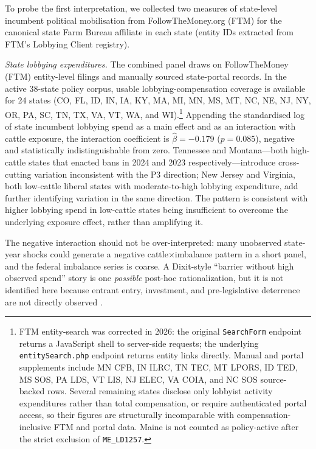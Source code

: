 \documentclass[12pt]{article}
\begin{document}
To probe the first interpretation, we collected two measures of state-level incumbent political mobilisation from FollowTheMoney.org (FTM) for the canonical state Farm Bureau affiliate in each state (entity IDs extracted from FTM's Lobbying Client registry).

\textit{State lobbying expenditures.}  The combined panel draws on FollowTheMoney (FTM) entity-level filings and manually sourced state-portal records.  In the active 38-state policy corpus, usable lobbying-compensation coverage is available for 24 states (CO, FL, ID, IN, IA, KY, MA, MI, MN, MS, MT, NC, NE, NJ, NY, OR, PA, SC, TN, TX, VA, VT, WA, and WI).\footnote{FTM entity-search was corrected in 2026: the original \texttt{SearchForm} endpoint returns a JavaScript shell to server-side requests; the underlying \texttt{entitySearch.php} endpoint returns entity links directly.  Manual and portal supplements include MN CFB, IN ILRC, TN TEC, MT LPORS, ID TED, MS SOS, PA LDS, VT LIS, NJ ELEC, VA COIA, and NC SOS source-backed rows.  Several remaining states disclose only lobbyist activity expenditures rather than total compensation, or require authenticated portal access, so their figures are structurally incomparable with compensation-inclusive FTM and portal data.  Maine is not counted as policy-active after the strict exclusion of \texttt{ME\_LD1257}.}  Appending the standardised log of state incumbent lobbying spend as a main effect and as an interaction with cattle exposure, the interaction coefficient is $\hat{\beta} = -0.179$ ($p = 0.085$), negative and statistically indistinguishable from zero.  Tennessee and Montana---both high-cattle states that enacted bans in 2024 and 2023 respectively---introduce cross-cutting variation inconsistent with the P3 direction; New Jersey and Virginia, both low-cattle liberal states with moderate-to-high lobbying expenditure, add further identifying variation in the same direction.  The pattern is consistent with higher lobbying spend in low-cattle states being insufficient to overcome the underlying exposure effect, rather than amplifying it.

The negative interaction should not be over-interpreted: many unobserved state-year shocks could generate a negative cattle$\times$imbalance pattern in a short panel, and the federal imbalance series is coarse.  A Dixit-style ``barrier without high observed spend'' story is one \emph{possible} post-hoc rationalization, but it is not identified here because entrant entry, investment, and pre-legislative deterrence are not directly observed \citep{dixit1980role}.
\end{document}

